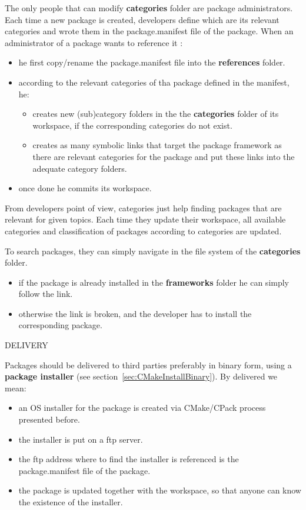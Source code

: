 \documentclass[12pt,a4paper]{article}
\begin{document}
The only people that can modify \textbf{categories} folder are package administrators. Each time a new package is created, developers define which are its relevant categories and wrote them in the package.manifest file of the package. When an administrator of a package wants to reference it :
\begin{itemize}
\item he first copy/rename the package.manifest file into the \textbf{references} folder.
\item according to the relevant categories of tha package defined in the manifest, he:
\begin{itemize}
\item creates new (sub)category folders in the the \textbf{categories} folder of its workspace, if the corresponding categories do not exist.
\item creates as many symbolic links that target the package framework as there are relevant categories for the package and put these links into the adequate category folders.
\end{itemize}
\item once done he commits its workspace.
\end{itemize}

From developers point of view, categories just help finding packages that are relevant for given topics. Each time they update their workspace, all available categories and classification of packages according to categories are updated. 

To search packages, they can simply navigate in the file system of the \textbf{categories} folder. 
\begin{itemize}
\item if the package is already installed in the \textbf{frameworks} folder he can simply follow the link.
\item otherwise the link is broken, and the developer has to install the corresponding package.
\end{itemize}


DELIVERY

Packages should be delivered to third parties preferably in binary form, using a \textbf{package installer} (see section~\ref{sec:CMakeInstallBinary}). By delivered we mean:
\begin{itemize}
\item an OS installer for the package is created via CMake/CPack process presented before.
\item the installer is put on a ftp server.
\item the ftp address where to find the installer is referenced is the package.manifest file of the package.
\item the package is updated together with the workspace, so that anyone can know the existence of the installer.
\end{itemize}
\end{document}
